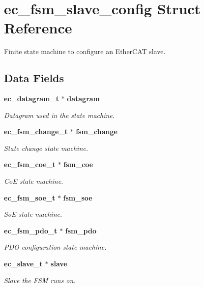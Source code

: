 \section{ec\-\_\-fsm\-\_\-slave\-\_\-config Struct Reference}
\label{structec__fsm__slave__config}


Finite state machine to configure an Ether\-C\-A\-T slave.  


\subsection*{Data Fields}
\begin{DoxyCompactItemize}
\item 
{\bf ec\-\_\-datagram\-\_\-t} $\ast$ {\bf datagram}
\begin{DoxyCompactList}\small\item\em Datagram used in the state machine. \end{DoxyCompactList}\item 
{\bf ec\-\_\-fsm\-\_\-change\-\_\-t} $\ast$ {\bf fsm\-\_\-change}
\begin{DoxyCompactList}\small\item\em State change state machine. \end{DoxyCompactList}\item 
{\bf ec\-\_\-fsm\-\_\-coe\-\_\-t} $\ast$ {\bf fsm\-\_\-coe}
\begin{DoxyCompactList}\small\item\em Co\-E state machine. \end{DoxyCompactList}\item 
{\bf ec\-\_\-fsm\-\_\-soe\-\_\-t} $\ast$ {\bf fsm\-\_\-soe}
\begin{DoxyCompactList}\small\item\em So\-E state machine. \end{DoxyCompactList}\item 
{\bf ec\-\_\-fsm\-\_\-pdo\-\_\-t} $\ast$ {\bf fsm\-\_\-pdo}
\begin{DoxyCompactList}\small\item\em P\-D\-O configuration state machine. \end{DoxyCompactList}\item 
{\bf ec\-\_\-slave\-\_\-t} $\ast$ {\bf slave}
\begin{DoxyCompactList}\small\item\em Slave the F\-S\-M runs on. \end{DoxyCompactList}\item 

\end{DoxyCompactItemize}
